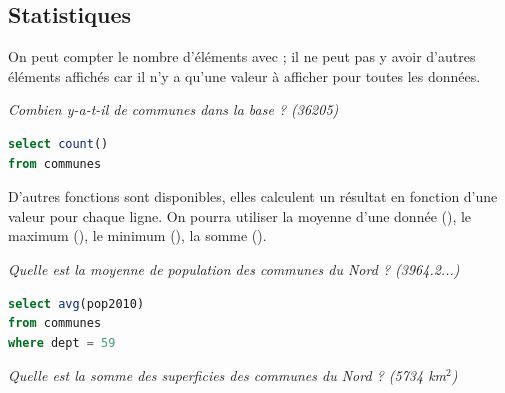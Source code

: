 \subsection{Statistiques}
On peut compter le nombre d'éléments avec  ; il ne peut pas y avoir d'autres éléments affichés car il n'y a qu'une valeur à afficher pour toutes les données. 
\begin{Exercise}
\textit{Combien y-a-t-il de communes dans la base ? (36205)}
\end{Exercise}
\begin{Answer}
\begin{lstlisting}[language=SQL]
select count()
from communes 
\end{lstlisting}
\end{Answer}
D'autres fonctions sont disponibles, elles calculent un résultat en fonction d'une valeur pour chaque ligne.
On pourra utiliser la moyenne d'une donnée (), le maximum (), le minimum (), la somme ().
\begin{Exercise}
\textit{Quelle est la moyenne de population des communes du Nord ? (3964.2...)}
\end{Exercise}
\begin{Answer}
\begin{lstlisting}[language=SQL]
select avg(pop2010)
from communes
where dept = 59
\end{lstlisting}
\end{Answer}
\begin{Exercise}
\textit{Quelle est la somme des superficies des communes du Nord ? (5734 km$^2$)}
\end{Exercise}
